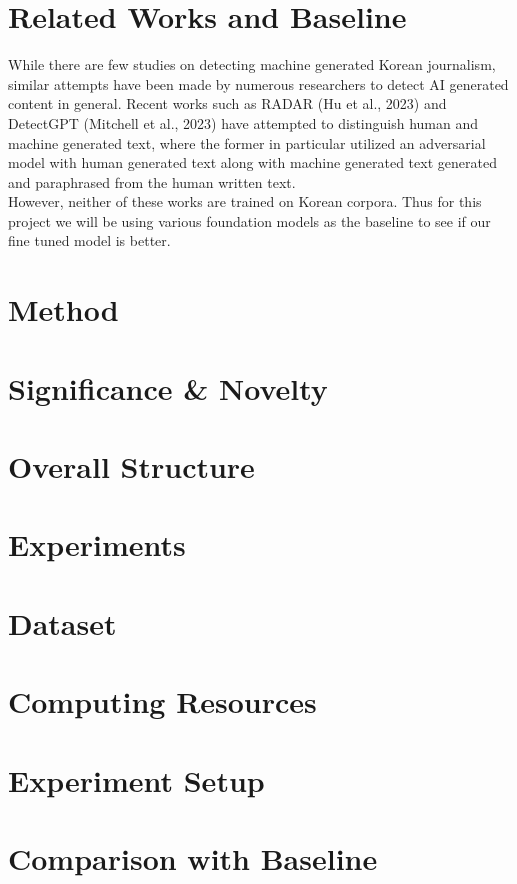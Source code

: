 \documentclass{article}
\begin{document}
\section{Related Works and Baseline}
While there are few studies on detecting machine generated Korean journalism, similar attempts have been made by numerous researchers to detect AI generated content in general.
Recent works such as RADAR (Hu et al., 2023) and DetectGPT (Mitchell et al., 2023) have attempted to distinguish human and machine generated text,
where the former in particular utilized an adversarial model with human generated text along with machine generated text generated and paraphrased from the human written text. \\
However, neither of these works are trained on Korean corpora.
Thus for this project we will be using various foundation models as the baseline to see if our fine tuned model is better.

\section{Method}

\section{Significance \& Novelty}

\section{Overall Structure}

\section{Experiments}

\section{Dataset}

\section{Computing Resources}

\section{Experiment Setup}

\section{Comparison with Baseline}
\end{document}
